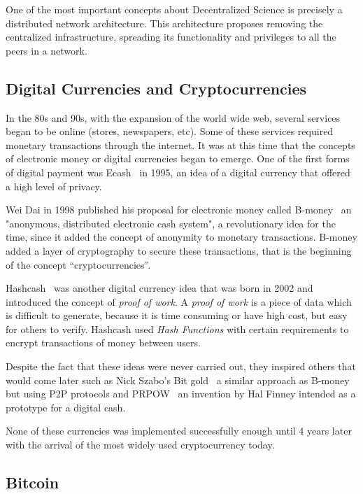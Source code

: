 One of the most important concepts about Decentralized Science is precisely a
distributed network architecture. This architecture proposes removing the
centralized infrastructure, spreading its functionality and privileges to all
the peers in a network.

\subsection{Digital Currencies and Cryptocurrencies}
\label{tb:cryptos}

In the 80s and 90s, with the expansion of the world wide web, several services
began to be online (stores, newspapers, etc). Some of these services required
monetary transactions through the internet. It was at this time that the
concepts of electronic money or digital currencies began to emerge. One of the
first forms of digital payment was Ecash~\cite{chaum1995introduction} in 1995,
an idea of a digital currency that offered a high level of privacy.

Wei Dai in 1998 published his proposal for electronic money called
B-money~\cite{dai1998b} an "anonymous, distributed electronic cash system", a
revolutionary idea for the time, since it added the concept of anonymity to
monetary transactions. B-money added a layer of cryptography to secure these
transactions, that is the beginning of the concept ``cryptocurrencies''.

Hashcash~\cite{back2002hashcash} was another digital currency idea that was born
in 2002 and introduced the concept of \emph{proof of work}. A \emph{proof of
  work} is a piece of data which is difficult to generate, because it is time
consuming or have high cost, but easy for others to verify. Hashcash used
\emph{Hash Functions} with certain requirements to encrypt transactions of money
between users.

Despite the fact that these ideas were never carried out, they inspired others
that would come later such as Nick Szabo's Bit gold~\cite{szabo2008bit} a similar approach as
B-money but using P2P protocols and PRPOW~\cite{finney2005rpow} an invention by
Hal Finney intended as a prototype for a digital cash.

None of these currencies was implemented successfully enough until 4 years later
with the arrival of the most widely used cryptocurrency today.

\subsection{Bitcoin}
\label{tb:bc}

